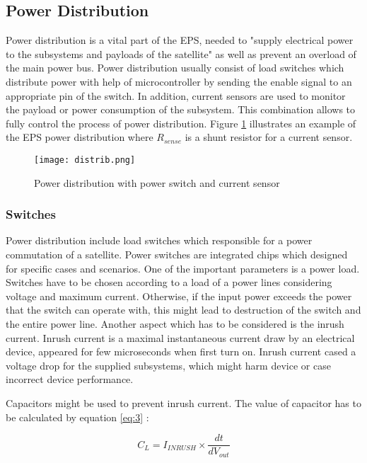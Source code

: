 \subsection{Power Distribution \label{sec:tech}}

Power distribution is a vital part of the EPS, needed to \cite{21} "supply electrical power to the subsystems and payloads of the satellite" as well as prevent an overload of the main power bus. Power distribution usually consist of load switches which distribute power with help of microcontroller by sending the enable signal to an appropriate pin of the switch. In addition, current sensors are used to monitor the payload or power consumption of the subsystem. This combination allows to fully control the process of power distribution. Figure \ref{fig: EPS111} illustrates an example of the EPS power distribution where $R_{sense}$ is a shunt resistor for a current sensor. 


\begin{figure}[h]
	\centering
	\texttt{[image: distrib.png]}
	\caption{Power distribution with power switch and current sensor}
	\label{fig: EPS111}
\end{figure}

\newpage

\subsubsection{Switches}
Power distribution include load switches which responsible for a power commutation of a satellite. Power switches are integrated chips which designed for specific cases and scenarios. One of the important parameters is a power load. Switches have to be chosen according to a load of a power lines considering voltage and maximum current. Otherwise, if the input power exceeds the power that the switch can operate with, this might lead to destruction of the switch and the entire power line.  Another aspect which has to be considered is the inrush current. Inrush current is a maximal instantaneous current draw by an electrical device, appeared for few microseconds when first turn on. Inrush current cased a voltage drop for the supplied subsystems, which might harm device or case incorrect device performance.

 Capacitors might be used to prevent inrush current. The value of capacitor has to be calculated by equation \ref{eq:3} \cite{32}:
 
 \begin{equation}\label{eq:3}
 C_{L} = I_{INRUSH} \times \dfrac{dt}{dV_{out}}
 \end{equation}
 
